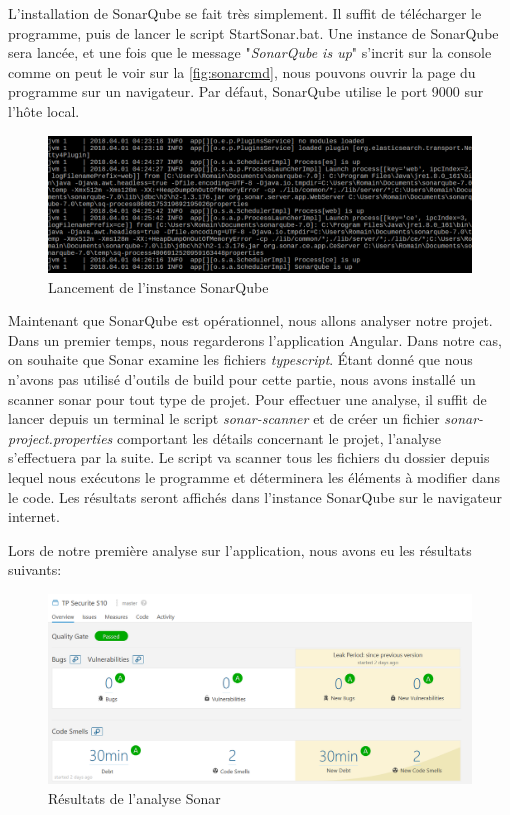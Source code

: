 \documentclass{polytech/polytech}
\begin{document}
L'installation de SonarQube se fait très simplement. Il suffit de télécharger le programme, puis de lancer le script StartSonar.bat. Une instance de SonarQube sera lancée, et une fois que le message "\textit{SonarQube is up}" s'incrit sur la console comme on peut le voir sur la \autoref{fig:sonarcmd}, nous pouvons ouvrir la page du programme sur un navigateur. Par défaut, SonarQube utilise le port 9000 sur l'hôte local.


\begin{figure}
	\includegraphics[scale=0.6]{sonarcmd.png}
	\caption{Lancement de l'instance SonarQube}
	\label{fig:sonarcmd}
\end{figure}


Maintenant que SonarQube est opérationnel, nous allons analyser notre projet. Dans un premier temps, nous regarderons l'application Angular. Dans notre cas, on souhaite que Sonar examine les fichiers \textit{typescript}. \'{E}tant donné que nous n'avons pas utilisé d'outils de build pour cette partie, nous avons installé un scanner sonar pour tout type de projet. Pour effectuer une analyse, il suffit de lancer depuis un terminal le script \textit{sonar-scanner} et de créer un fichier \textit{sonar-project.properties} comportant les détails concernant le projet, l'analyse s'effectuera par la suite. Le script va scanner tous les fichiers du dossier depuis lequel nous exécutons le programme et déterminera les éléments à modifier dans le code. Les résultats seront affichés dans l'instance SonarQube sur le navigateur internet.


Lors de notre première analyse sur l'application, nous avons eu les résultats suivants: 

\begin{figure}
	\includegraphics[scale=0.55]{sonarresult.png}
	\caption{Résultats de l'analyse Sonar}
	\label{fig:sonarresult}
\end{figure}
\end{document}
